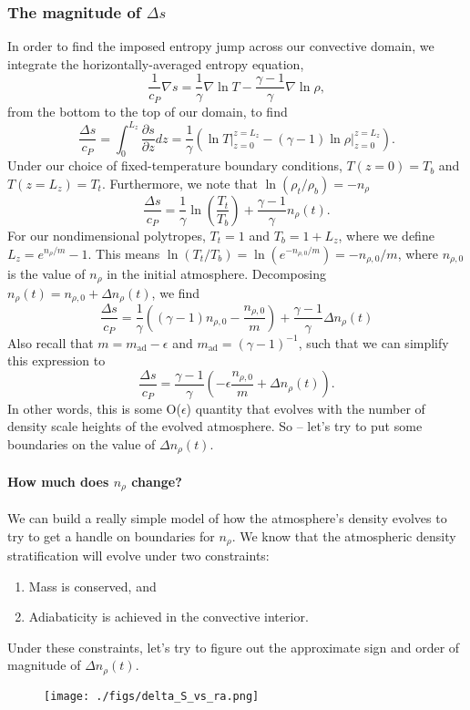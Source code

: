 \documentclass[aps, pre, onecolumn, nofootinbib, notitlepage, groupedaddress, amsfonts, amssymb, amsmath, longbibliography, superscriptaddress]{revtex4-1}
\newcommand{\grad}{\ensuremath{\nabla}}
\begin{document}
\subsubsection{The magnitude of $\Delta s$}
In order to find the imposed entropy jump across our convective domain, we integrate the horizontally-averaged entropy equation,
\begin{equation}
\frac{1}{c_P}\grad s = \frac{1}{\gamma}\grad\ln T - \frac{\gamma - 1}{\gamma}\grad \ln \rho,
\end{equation}
from the bottom to the top of our domain, to find 
$$
\frac{\Delta s}{c_P} = \int_0^{L_z} \frac{\partial s}{\partial z} dz = \frac{1}{\gamma}\left(\ln T\bigg|_{z=0}^{z=L_z} - (\gamma-1)\ln\rho\bigg|_{z=0}^{z=L_z}\right).
$$
Under our choice of fixed-temperature boundary conditions, $T(z=0) = T_b$ and $T(z=L_z) = T_t$.
Furthermore, we note that $\ln(\rho_t/\rho_b) = -n_\rho$
\begin{equation}
\frac{\Delta s}{c_P} = \frac{1}{\gamma}\ln\left(\frac{T_t}{T_b}\right) + \frac{\gamma-1}{\gamma} n_\rho(t).
\end{equation}
For our nondimensional polytropes, $T_t = 1$ and $T_b = 1 + L_z$, where we define $L_z = e^{n_\rho/m} - 1$.
This means $\ln (T_t/T_b) = \ln (e^{-n_{\rho,0}/m}) = -n_{\rho,0}/m$, where $n_{\rho,0}$ is the value of $n_\rho$ in the initial atmosphere.
Decomposing $n_\rho(t) = n_{\rho,0} + \Delta n_\rho(t)$, we find
\begin{equation}
\frac{\Delta s}{c_P} = \frac{1}{\gamma}\left((\gamma-1)n_{\rho,0} - \frac{n_{\rho,0}}{m}\right) + \frac{\gamma-1}{\gamma}\Delta n_\rho(t)
\end{equation}
Also recall that $m = m_{\text{ad}} - \epsilon$ and $m_{\text{ad}} = (\gamma-1)^{-1}$, such that we can simplify this expression to 
\begin{equation}
\frac{\Delta s}{c_P} = \frac{\gamma-1}{\gamma}\left( -\epsilon \frac{n_{\rho,0}}{m} + \Delta n_\rho(t)\right).
\end{equation}
In other words, this is some O($\epsilon$) quantity that evolves with the number of density scale heights of the evolved atmosphere.
So -- let's try to put some boundaries on the value of $\Delta n_\rho(t)$.

\paragraph{How much does $n_\rho$ change?}
We can build a really simple model of how the atmosphere's density evolves to try to get a handle on boundaries for $n_\rho$.
We know that the atmospheric density stratification will evolve under two constraints:
\begin{enumerate}
\item Mass is conserved, and
\item Adiabaticity is achieved in the convective interior.
\end{enumerate}
Under these constraints, let's try to figure out the approximate sign and order of magnitude of $\Delta n_\rho(t)$.



\begin{figure}[p!]
\texttt{[image: ./figs/delta\_S\_vs\_ra.png]}
\caption{ 
	\label{fig:delta_S_vs_ra} }
\end{figure}
\end{document}

